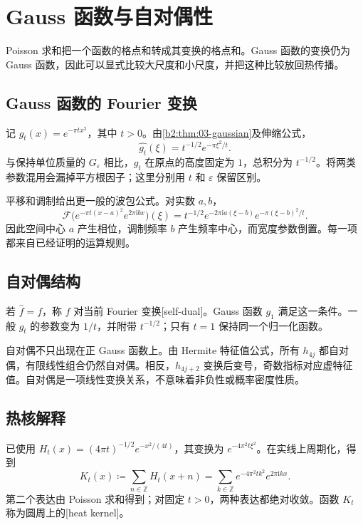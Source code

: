 \section{Gauss 函数与自对偶性}
\label{b2:sec:0602}

Poisson 求和把一个函数的格点和转成其变换的格点和。Gauss 函数的变换仍为 Gauss 函数，因此可以显式比较大尺度和小尺度，并把这种比较放回热传播。

\subsection{Gauss 函数的 Fourier 变换}
\label{b2:subsec:060201}

记 \(g_t(x)=e^{-\pi t x^2}\)，其中 \(t>0\)。由\cref{b2:thm:03-gaussian}及伸缩公式，
\[
 \widehat {g_t}(\xi)=t^{-1/2}e^{-\pi\xi^2/t}.
\]
与保持单位质量的 \(G_\varepsilon\) 相比，\(g_t\) 在原点的高度固定为 \(1\)，总积分为 \(t^{-1/2}\)。将两类参数混用会漏掉平方根因子；这里分别用 \(t\) 和 \(\varepsilon\) 保留区别。

\ProseParagraphBreak

平移和调制给出更一般的波包公式。对实数 \(a,b\)，
\[
 \mathcal F\bigl(e^{-\pi t(x-a)^2}e^{2\pi\mathrm{i}bx}\bigr)(\xi)
 =t^{-1/2}e^{-2\pi\mathrm{i}a(\xi-b)}e^{-\pi(\xi-b)^2/t}.
\]
因此空间中心 \(a\) 产生相位，调制频率 \(b\) 产生频率中心，而宽度参数倒置。每一项都来自已经证明的运算规则。

\subsection{自对偶结构}
\label{b2:subsec:060202}

若 \(\widehat f=f\)，称 \(f\) 对当前 Fourier 变换[self-dual]。Gauss 函数 \(g_1\) 满足这一条件。一般 \(g_t\) 的参数变为 \(1/t\)，并附带 \(t^{-1/2}\)；只有 \(t=1\) 保持同一个归一化函数。

\ProseParagraphBreak

自对偶不只出现在正 Gauss 函数上。由 Hermite 特征值公式，所有 \(h_{4j}\) 都自对偶，有限线性组合仍然自对偶。相反，\(h_{4j+2}\) 变换后变号，奇数指标对应虚特征值。自对偶是一项线性变换关系，不意味着非负性或概率密度性质。

\subsection{热核解释}
\label{b2:subsec:060203}

已使用 \(H_t(x)=(4\pi t)^{-1/2}e^{-x^2/(4t)}\)，其变换为 \(e^{-4\pi^2t\xi^2}\)。在实线上周期化，得到
\begin{equation}\label{b2:eq:06-periodic-heat}
 K_t(x)\coloneqq\sum_{n\in\mathbb Z}H_t(x+n)
 =\sum_{k\in\mathbb Z}e^{-4\pi^2tk^2}e^{2\pi\mathrm{i}kx}.
\end{equation}
第二个表达由 Poisson 求和得到；对固定 \(t>0\)，两种表达都绝对收敛。函数 \(K_t\) 称为圆周上的[heat kernel]。

